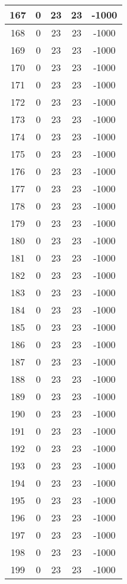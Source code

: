 \documentclass[letterpaper, 12pt]{article}
\begin{document}
\begin{longtable}{|c|c|c|c|c|}
\hline
167 & 0 & 23 & 23 & -1000 \\
\hline
168 & 0 & 23 & 23 & -1000 \\
\hline
169 & 0 & 23 & 23 & -1000 \\
\hline
170 & 0 & 23 & 23 & -1000 \\
\hline
171 & 0 & 23 & 23 & -1000 \\
\hline
172 & 0 & 23 & 23 & -1000 \\
\hline
173 & 0 & 23 & 23 & -1000 \\
\hline
174 & 0 & 23 & 23 & -1000 \\
\hline
175 & 0 & 23 & 23 & -1000 \\
\hline
176 & 0 & 23 & 23 & -1000 \\
\hline
177 & 0 & 23 & 23 & -1000 \\
\hline
178 & 0 & 23 & 23 & -1000 \\
\hline
179 & 0 & 23 & 23 & -1000 \\
\hline
180 & 0 & 23 & 23 & -1000 \\
\hline
181 & 0 & 23 & 23 & -1000 \\
\hline
182 & 0 & 23 & 23 & -1000 \\
\hline
183 & 0 & 23 & 23 & -1000 \\
\hline
184 & 0 & 23 & 23 & -1000 \\
\hline
185 & 0 & 23 & 23 & -1000 \\
\hline
186 & 0 & 23 & 23 & -1000 \\
\hline
187 & 0 & 23 & 23 & -1000 \\
\hline
188 & 0 & 23 & 23 & -1000 \\
\hline
189 & 0 & 23 & 23 & -1000 \\
\hline
190 & 0 & 23 & 23 & -1000 \\
\hline
191 & 0 & 23 & 23 & -1000 \\
\hline
192 & 0 & 23 & 23 & -1000 \\
\hline
193 & 0 & 23 & 23 & -1000 \\
\hline
194 & 0 & 23 & 23 & -1000 \\
\hline
195 & 0 & 23 & 23 & -1000 \\
\hline
196 & 0 & 23 & 23 & -1000 \\
\hline
197 & 0 & 23 & 23 & -1000 \\
\hline
198 & 0 & 23 & 23 & -1000 \\
\hline
199 & 0 & 23 & 23 & -1000 \\
\hline
\end{longtable}
\end{document}
